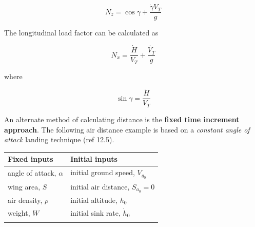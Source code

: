 \documentclass[
]{book}
\begin{document}
\[
N_z = \cos \gamma + \frac{\dot{\gamma} V_T}{g}
\]

The longitudinal load factor can be calculated as

\[
N_x = \frac{\dot{H}}{V_T} + \frac{\dot{V_T}}{g}
\]

where

\[
\sin \gamma = \frac{\dot{H}}{V_T}
\]

An alternate method of calculating distance is the \textbf{fixed time increment approach}.
The following air distance example is based on a \emph{constant angle of attack}
landing technique (ref 12.5).

\begin{longtable}[]{@{}ll@{}}
\toprule
\begin{minipage}[b]{0.56\columnwidth}\raggedright
Fixed inputs\strut
\end{minipage} & \begin{minipage}[b]{0.38\columnwidth}\raggedright
Initial inputs\strut
\end{minipage}\tabularnewline
\midrule
\endhead
\begin{minipage}[t]{0.56\columnwidth}\raggedright
angle of attack, \(\alpha\)\strut
\end{minipage} & \begin{minipage}[t]{0.38\columnwidth}\raggedright
initial ground speed, \(V_{g_0}\)\strut
\end{minipage}\tabularnewline
\begin{minipage}[t]{0.56\columnwidth}\raggedright
wing area, \(S\)\strut
\end{minipage} & \begin{minipage}[t]{0.38\columnwidth}\raggedright
initial air distance, \(S_{a_0} = 0\)\strut
\end{minipage}\tabularnewline
\begin{minipage}[t]{0.56\columnwidth}\raggedright
air density, \(\rho\)\strut
\end{minipage} & \begin{minipage}[t]{0.38\columnwidth}\raggedright
initial altitude, \(h_0\)\strut
\end{minipage}\tabularnewline
\begin{minipage}[t]{0.56\columnwidth}\raggedright
weight, \(W\)\strut
\end{minipage} & \begin{minipage}[t]{0.38\columnwidth}\raggedright
initial sink rate, \(\dot{h}_0\)\strut
\end{minipage}\tabularnewline
\begin{minipage}[t]{0.56\columnwidth}\raggedright

\end{minipage}
\end{longtable}
\end{document}
